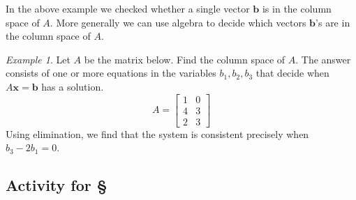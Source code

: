 \documentclass[11pt,oneside]{amsbook}
\theoremstyle{definition}
\theoremstyle{plain}
\theoremstyle{definition}
\theoremstyle{remark}
\newtheorem{example}[theorem]{Example}
\numberwithin{equation}{section}
\numberwithin{figure}{section}
\begin{document}
In the above example we checked whether a single vector $\mathbf{b}$ is in the column space of $A$. More generally we can use algebra to decide which vectors $\mathbf{b}$'s are in the column space of $A$.

\begin{example}
  Let $A$ be the matrix below. Find the column space of $A$. The answer consists of one or more equations in the variables $b_1,b_2,b_3$ that decide when $A\mathbf{x}=\mathbf{b}$ has a solution.
  \[A=\begin{bmatrix}
      1&0\\
      4&3\\
      2&3
    \end{bmatrix}
  \]
  Using elimination, we find that the system is consistent precisely when $b_3-2b_1=0$.
\end{example}


\newpage
\subsection*{Activity for \S \thesection}
\end{document}
